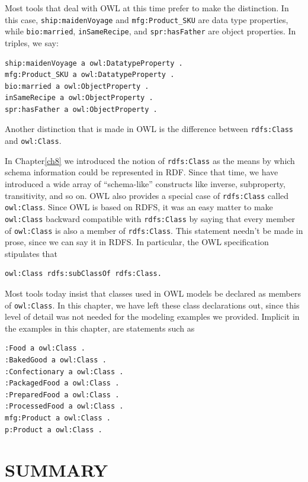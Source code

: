 Most tools that deal with OWL at this time prefer to make the
distinction. In this case, \texttt{ship:maidenVoyage} and \texttt{mfg:Product\_SKU} are
data type properties, while \texttt{bio:married}, \texttt{inSameRecipe}, and \texttt{spr:hasFather}
are object properties. In triples, we say:

\begin{lstlisting}
ship:maidenVoyage a owl:DatatypeProperty .
mfg:Product_SKU a owl:DatatypeProperty .
bio:married a owl:ObjectProperty .
inSameRecipe a owl:ObjectProperty .
spr:hasFather a owl:ObjectProperty .
\end{lstlisting}

Another distinction that is made in OWL is the difference between
\texttt{rdfs:Class} and \texttt{owl:Class}.

In Chapter\ref{ch8} we introduced the notion of \texttt{rdfs:Class} as the means by
which schema information could be represented in RDF. Since that time,
we have introduced a wide array of ``schema-like'' constructs like
inverse, subproperty, transitivity, and so on. OWL also provides a
special case of \texttt{rdfs:Class} called \texttt{owl:Class}. Since OWL is based on RDFS,
it was an easy matter to make \texttt{owl:Class} backward compatible with
\texttt{rdfs:Class} by saying that every member of \texttt{owl:Class} is also a member of
\texttt{rdfs:Class}. This statement needn't be made in prose, since we can say it
in RDFS. In particular, the OWL specification stipulates that

\begin{lstlisting}
owl:Class rdfs:subClassOf rdfs:Class.
\end{lstlisting}

Most tools today insist that classes used in OWL models be declared as
members of \texttt{owl:Class}. In this chapter, we have left these class
declarations out, since this level of detail was not needed for the
modeling examples we provided. Implicit in the examples in this chapter,
are statements such as

\begin{lstlisting}
:Food a owl:Class .
:BakedGood a owl:Class .
:Confectionary a owl:Class .
:PackagedFood a owl:Class .
:PreparedFood a owl:Class .
:ProcessedFood a owl:Class .
mfg:Product a owl:Class .
p:Product a owl:Class .
\end{lstlisting}

\section{SUMMARY}

